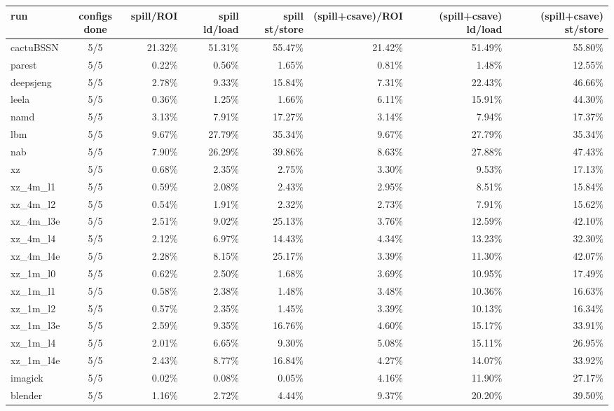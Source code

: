 \documentclass[10pt,a4paper,landscape]{article}
\begin{document}
{\footnotesize
\begin{longtable}{lcrrrrrr}
\toprule
run & configs done & spill/ROI & spill ld/load & spill st/store & (spill+csave)/ROI & (spill+csave) ld/load & (spill+csave) st/store \\
\midrule
\endhead
\bottomrule
\endfoot
cactuBSSN & 5/5 & 21.32\% & 51.31\% & 55.47\% & 21.42\% & 51.49\% & 55.80\% \\
parest & 5/5 & 0.22\% & 0.56\% & 1.65\% & 0.81\% & 1.48\% & 12.55\% \\
deepsjeng & 5/5 & 2.78\% & 9.33\% & 15.84\% & 7.31\% & 22.43\% & 46.66\% \\
leela & 5/5 & 0.36\% & 1.25\% & 1.66\% & 6.11\% & 15.91\% & 44.30\% \\
namd & 5/5 & 3.13\% & 7.91\% & 17.27\% & 3.14\% & 7.94\% & 17.37\% \\
lbm & 5/5 & 9.67\% & 27.79\% & 35.34\% & 9.67\% & 27.79\% & 35.34\% \\
nab & 5/5 & 7.90\% & 26.29\% & 39.86\% & 8.63\% & 27.88\% & 47.43\% \\
xz & 5/5 & 0.68\% & 2.35\% & 2.75\% & 3.30\% & 9.53\% & 17.13\% \\
xz\_4m\_l1 & 5/5 & 0.59\% & 2.08\% & 2.43\% & 2.95\% & 8.51\% & 15.84\% \\
xz\_4m\_l2 & 5/5 & 0.54\% & 1.91\% & 2.32\% & 2.73\% & 7.91\% & 15.62\% \\
xz\_4m\_l3e & 5/5 & 2.51\% & 9.02\% & 25.13\% & 3.76\% & 12.59\% & 42.10\% \\
xz\_4m\_l4 & 5/5 & 2.12\% & 6.97\% & 14.43\% & 4.34\% & 13.23\% & 32.30\% \\
xz\_4m\_l4e & 5/5 & 2.28\% & 8.15\% & 25.17\% & 3.39\% & 11.30\% & 42.07\% \\
xz\_1m\_l0 & 5/5 & 0.62\% & 2.50\% & 1.68\% & 3.69\% & 10.95\% & 17.49\% \\
xz\_1m\_l1 & 5/5 & 0.58\% & 2.38\% & 1.48\% & 3.48\% & 10.36\% & 16.63\% \\
xz\_1m\_l2 & 5/5 & 0.57\% & 2.35\% & 1.45\% & 3.39\% & 10.13\% & 16.34\% \\
xz\_1m\_l3e & 5/5 & 2.59\% & 9.35\% & 16.76\% & 4.60\% & 15.17\% & 33.91\% \\
xz\_1m\_l4 & 5/5 & 2.01\% & 6.65\% & 9.30\% & 5.08\% & 15.11\% & 26.95\% \\
xz\_1m\_l4e & 5/5 & 2.43\% & 8.77\% & 16.84\% & 4.27\% & 14.07\% & 33.92\% \\
imagick & 5/5 & 0.02\% & 0.08\% & 0.05\% & 4.16\% & 11.90\% & 27.17\% \\
blender & 5/5 & 1.16\% & 2.72\% & 4.44\% & 9.37\% & 20.20\% & 39.50\% \\

\end{longtable}}
\end{document}
